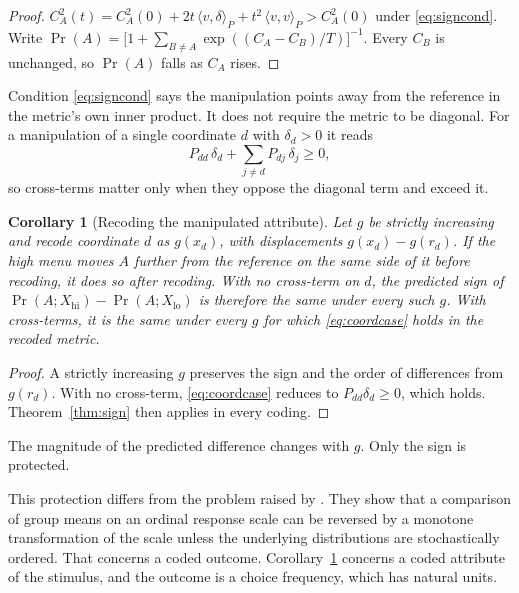 \documentclass[11pt]{article}
\newtheorem{corollary}{Corollary}
\theoremstyle{definition}
\newcommand{\ip}[2]{\langle #1, #2\rangle_P}
\DeclareMathOperator{\Prob}{Pr}
\begin{document}
\begin{proof}
$C_A^2(t) = C_A^2(0) + 2t\,\ip{v}{\delta} + t^2\,\ip{v}{v} > C_A^2(0)$ under \eqref{eq:signcond}.
Write $\Prob(A) = \bigl[1 + \sum_{B \ne A} \exp((C_A - C_B)/T)\bigr]^{-1}$.
Every $C_B$ is unchanged, so $\Prob(A)$ falls as $C_A$ rises.
\end{proof}

Condition \eqref{eq:signcond} says the manipulation points away from the reference in the metric's own inner product.
It does not require the metric to be diagonal.
For a manipulation of a single coordinate $d$ with $\delta_d > 0$ it reads
\begin{equation}\label{eq:coordcase}
P_{dd}\,\delta_d + \sum_{j \ne d} P_{dj}\,\delta_j \ge 0,
\end{equation}
so cross-terms matter only when they oppose the diagonal term and exceed it.

\begin{corollary}[Recoding the manipulated attribute]\label{cor:recode}
Let $g$ be strictly increasing and recode coordinate $d$ as $g(x_d)$, with displacements $g(x_d) - g(r_d)$.
If the high menu moves $A$ further from the reference on the same side of it before recoding, it does so after recoding.
With no cross-term on $d$, the predicted sign of $\Prob(A; X_{\mathrm{hi}}) - \Prob(A; X_{\mathrm{lo}})$ is therefore the same under every such $g$.
With cross-terms, it is the same under every $g$ for which \eqref{eq:coordcase} holds in the recoded metric.
\end{corollary}

\begin{proof}
A strictly increasing $g$ preserves the sign and the order of differences from $g(r_d)$.
With no cross-term, \eqref{eq:coordcase} reduces to $P_{dd}\delta_d \ge 0$, which holds.
Theorem~\ref{thm:sign} then applies in every coding.
\end{proof}

The magnitude of the predicted difference changes with $g$.
Only the sign is protected.

This protection differs from the problem raised by \citet{BondLang2019}.
They show that a comparison of group means on an ordinal response scale can be reversed by a monotone transformation of the scale unless the underlying distributions are stochastically ordered.
That concerns a coded outcome.
Corollary~\ref{cor:recode} concerns a coded attribute of the stimulus, and the outcome is a choice frequency, which has natural units.
\end{document}
